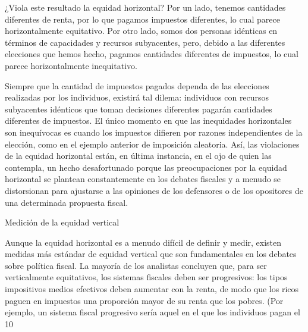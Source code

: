 \documentclass[10pt,a4paper]{article}
\begin{document}
¿Viola este resultado la equidad horizontal? Por un lado, tenemos cantidades diferentes de renta, por lo que pagamos impuestos diferentes, lo cual parece horizontalmente equitativo. Por otro lado, somos dos personas idénticas en términos de capacidades y recursos subyacentes, pero, debido a las diferentes elecciones que hemos hecho, pagamos cantidades diferentes de impuestos, lo cual parece horizontalmente inequitativo.

Siempre que la cantidad de impuestos pagados dependa de las elecciones realizadas por los individuos, existirá tal dilema: individuos con recursos subyacentes idénticos que toman decisiones diferentes pagarán cantidades diferentes de impuestos. El único momento en que las inequidades horizontales son inequívocas es cuando los impuestos difieren por razones independientes de la elección, como en el ejemplo anterior de imposición aleatoria. Así, las violaciones de la equidad horizontal están, en última instancia, en el ojo de quien las contempla, un hecho desafortunado porque las preocupaciones por la equidad horizontal se plantean constantemente en los debates fiscales y a menudo se distorsionan para ajustarse a las opiniones de los defensores o de los opositores de una determinada propuesta fiscal.

Medición de la equidad vertical

Aunque la equidad horizontal es a menudo difícil de definir y medir, existen medidas más estándar de equidad vertical que son fundamentales en los debates sobre política fiscal. La mayoría de los analistas concluyen que, para ser verticalmente equitativos, los sistemas fiscales deben ser progresivos: los tipos impositivos medios efectivos deben aumentar con la renta, de modo que los ricos paguen en impuestos una proporción mayor de su renta que los pobres. (Por ejemplo, un sistema fiscal progresivo sería aquel en el que los individuos pagan el 10 %
\end{document}
